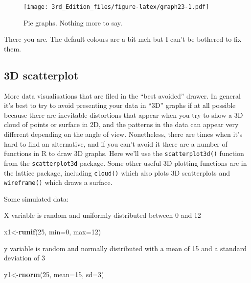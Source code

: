 \documentclass[
]{book}
\newenvironment{Shaded}{\begin{snugshade}}{\end{snugshade}}
\newcommand{\DataTypeTok}[1]{\textcolor[rgb]{0.13,0.29,0.53}{#1}}
\newcommand{\DecValTok}[1]{\textcolor[rgb]{0.00,0.00,0.81}{#1}}
\newcommand{\KeywordTok}[1]{\textcolor[rgb]{0.13,0.29,0.53}{\textbf{#1}}}
\newcommand{\NormalTok}[1]{#1}
\begin{document}
\begin{figure}
\centering
\texttt{[image: 3rd\_Edition\_files/figure-latex/graph23-1.pdf]}
\caption{\label{fig:graph23}Pie graphs. Nothing more to say.}
\end{figure}

There you are. The default colours are a bit meh but I can't be bothered to fix them.

\hypertarget{d-scatterplot}{%
\subsection{3D scatterplot}\label{d-scatterplot}}

More data visualisations that are filed in the ``best avoided'' drawer. In general it's best to try to avoid presenting your data in ``3D'' graphs if at all possible because there are inevitable distortions that appear when you try to show a 3D cloud of points or surface in 2D, and the patterns in the data can appear very different depending on the angle of view. Nonetheless, there are times when it's hard to find an alternative, and if you can't avoid it there are a number of functions in R to draw 3D graphs. Here we'll use the \texttt{scatterplot3d()} function from the \texttt{scatterplot3d} package. Some other useful 3D plotting functions are in the lattice package, including \texttt{cloud()} which also plots 3D scatterplots and \texttt{wireframe()} which draws a surface.

Some simulated data:

X variable is random and uniformly distributed between 0 and 12

\begin{Shaded}
\begin{Highlighting}[]
\NormalTok{x1<-}\KeywordTok{runif}\NormalTok{(}\DecValTok{25}\NormalTok{, }\DataTypeTok{min=}\DecValTok{0}\NormalTok{, }\DataTypeTok{max=}\DecValTok{12}\NormalTok{)        }
\end{Highlighting}
\end{Shaded}

y variable is random and normally distributed with a mean of 15 and a standard deviation of 3

\begin{Shaded}
\begin{Highlighting}[]
\NormalTok{y1<-}\KeywordTok{rnorm}\NormalTok{(}\DecValTok{25}\NormalTok{, }\DataTypeTok{mean=}\DecValTok{15}\NormalTok{, }\DataTypeTok{sd=}\DecValTok{3}\NormalTok{)    }
\end{Highlighting}
\end{Shaded}
\end{document}
